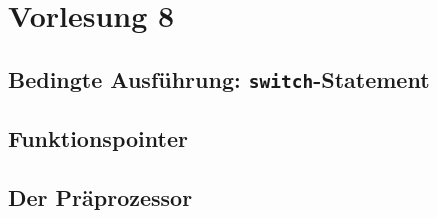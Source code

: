 \section{Vorlesung 8}

\setcounter{minutecounter}{0}

\subsection{Bedingte Ausführung: \texttt{switch}-Statement}

\subsection{Funktionspointer}

\subsection{Der Präprozessor}